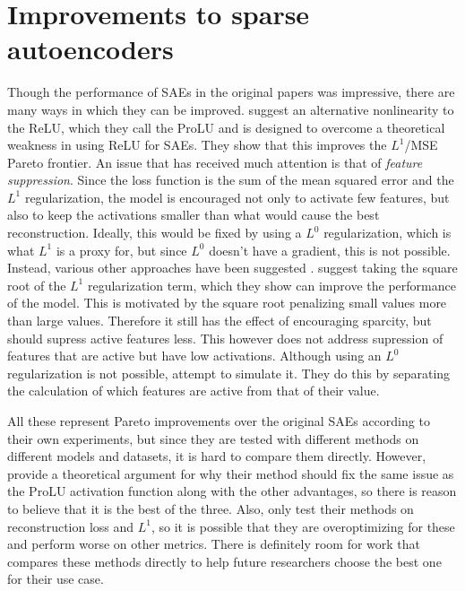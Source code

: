 \section{Improvements to sparse autoencoders}\label{sec:improvements_to_saes}
Though the performance of SAEs in the original papers \cite{bricken_towards_2023}\cite{cunningham_sparse_2023} was impressive, there are many ways in which they can be improved.
\cite{taggart_prolu_2024} suggest an alternative nonlinearity to the ReLU, which they call the ProLU and is designed to overcome a theoretical weakness in using ReLU for SAEs.
They show that this improves the $L^1$/MSE Pareto frontier.
An issue that has received much attention is that of \emph{feature suppression}.
Since the loss function is the sum of the mean squared error and the $L^1$ regularization, the model is encouraged not only to activate few features, but also to keep the activations smaller than what would cause the best reconstruction.
Ideally, this would be fixed by using a $L^0$ regularization, which is what $L^1$ is a proxy for, but since $L^0$ doesn't have a gradient, this is not possible.
Instead, various other approaches have been suggested \cite{wright_addressing_2024}.
\cite{riggs_improving_2024} suggest taking the square root of the $L^1$ regularization term, which they show can improve the performance of the model.
This is motivated by the square root penalizing small values more than large values.
Therefore it still has the effect of encouraging sparcity, but should supress active features less.
This however does not address supression of features that are active but have low activations.
Although using an $L^0$ regularization is not possible, \cite{rajamanoharan_improving_2024} attempt to simulate it.
They do this by separating the calculation of which features are active from that of their value.

All these represent Pareto improvements over the original SAEs according to their own experiments, but since they are tested with different methods on different models and datasets, it is hard to compare them directly.
However, \cite{rajamanoharan_improving_2024} provide a theoretical argument for why their method should fix the same issue as the ProLU activation function along with the other advantages, so there is reason to believe that it is the best of the three.
Also, \cite{riggs_improving_2024} only test their methods on reconstruction loss and $L^1$, so it is possible that they are overoptimizing for these and perform worse on other metrics.
There is definitely room for work that compares these methods directly to help future researchers choose the best one for their use case.


